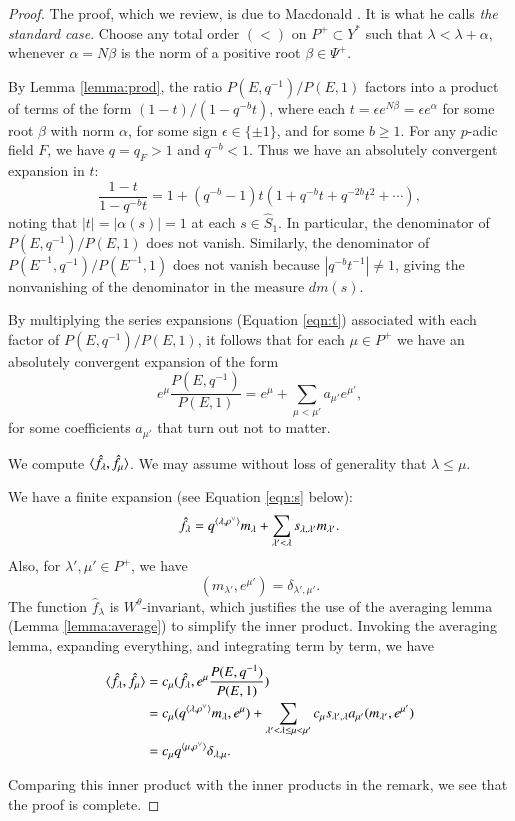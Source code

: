 \begin{proof}  
  The proof, which we review, is due to Macdonald
  \cite[Ch.V]{macdonaldspherical}.  It is what he calls {\it the
    standard case}.  Choose any total order $(<)$ on $P^+\subset Y^*$
  such that $\lambda < \lambda + \alpha$, whenever $\alpha = N\beta$
  is the norm of a positive root $\beta\in\Psi^+$.

  By Lemma \ref{lemma:prod}, the ratio $P(E,q^{-1})/P(E,1)$ factors
  into a product of terms of the form $(1- t)/(1- q^{-b} t)$, where
  each $t = \epsilon e^{N\beta} = \epsilon e^\alpha$ for some root
  $\beta$ with norm $\alpha$, for some sign $\epsilon\in \{\pm 1\}$,
  and for some $b\ge 1$.  For any $p$-adic field $F$, we have $q = q_F
  > 1$ and $q^{-b} < 1$.  Thus we have an absolutely convergent
  expansion in $t$:
\begin{equation}\label{eqn:t}
\frac{1- t}{1- q^{-b} t} = 1 + (q^{-b}-1) t (1+ q^{-b} t + q^{-2b} t^2 + \cdots),
\end{equation}
noting that $|t| = |\alpha(s)|=1$ at each $s\in \hat S_1$.  In
particular, the denominator of $P(E,q^{-1})/P(E,1)$ does not vanish.
Similarly, the denominator of $P(E^{-1},q^{-1})/P(E^{-1},1)$ does not
vanish because $|q^{-b} t^{-1}|\ne1$, giving the nonvanishing of the
denominator in the measure $dm(s)$.

By multiplying the series expansions (Equation \ref{eqn:t}) associated
with each factor of $P(E,q^{-1})/P(E,1)$, it follows that for each
$\mu\in P^+$ we have an absolutely convergent expansion of the form
\[
e^\mu \frac{P(E,q^{-1})}{P(E,1)} = e^\mu +\sum_{\mu< \mu'} a_{\mu'} e^{\mu'},
\] 
for some coefficients $a_{\mu'}$ that turn out not to matter.

We compute $\langle{\hat f_\lambda,\hat f_\mu}\rangle$.  We may assume without
loss of generality that $\lambda \le \mu$.


We have a finite expansion (see Equation \ref{eqn:s} below):
\[
\hat f_\lambda = q^{\langle{\lambda,\rho^\vee}\rangle} m_\lambda 
+ \sum_{\lambda' <\lambda } s_{\lambda,\lambda'} m_{\lambda'}.
\]
Also, for $\lambda',\mu'\in P^+$, we have
\[
(m_{\lambda'},e^{\mu'}) = \delta_{\lambda',{\mu'}}.
\]
The function $\hat f_\lambda$ is $W^\theta$-invariant, which justifies
the use of the averaging lemma (Lemma \ref{lemma:average}) to simplify
the inner product.  Invoking the averaging lemma, expanding
everything, and integrating term by term, we have
\begin{align*}
\langle{\hat f_\lambda,\hat f_\mu}\rangle 
&= c_\mu (\hat f_\lambda, e^\mu \frac{ P(E,q^{-1})}{P(E,1)})\\
&= c_\mu (q^{\langle{\lambda,\rho^\vee}\rangle} m_\lambda,e^\mu) 
+ \sum_{\lambda' < \lambda\le\mu < \mu'}
c_\mu s_{\lambda',\lambda} a_{\mu'} (m_{\lambda'},e^{\mu'})\\ 
&= c_\mu q^{\langle{\mu,\rho^\vee}\rangle} \delta_{\lambda,\mu}.
\end{align*}

Comparing this inner product with the inner products in the remark, we
see that the proof is complete.
\end{proof}

